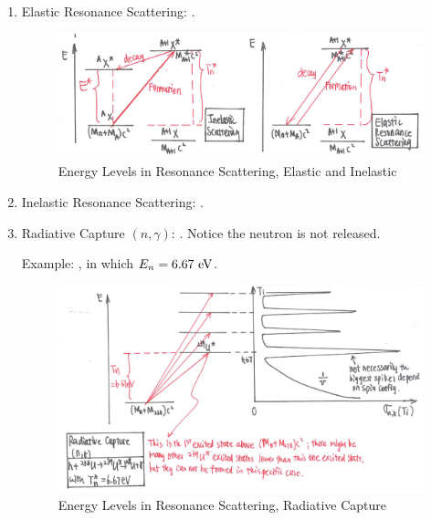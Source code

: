 \documentclass{school-22.101-notes}
\begin{document}
\begin{enumerate}
\item Elastic Resonance Scattering: .
\begin{figure}
   \centering
   \includegraphics[width=6in]{images/ni/compound-formation-scattering-energy.png}
   \caption{Energy Levels in Resonance Scattering, Elastic and Inelastic\label{compound-formation-scattering-energy}}
\end{figure}
\item Inelastic Resonance Scattering: .
\item Radiative Capture $(n, \gamma)$: 
. Notice the neutron is not released.

Example: , in which $E_n = 6.67 \mbox{ } \mathrm{eV}$.
\begin{figure}
   \centering
   \includegraphics[width=6in]{images/ni/compound-formation-rc-energy.png}
   \caption{Energy Levels in Resonance Scattering, Radiative Capture\label{compound-formation-rc-energy}}
\end{figure}


\end{enumerate}
\end{document}

